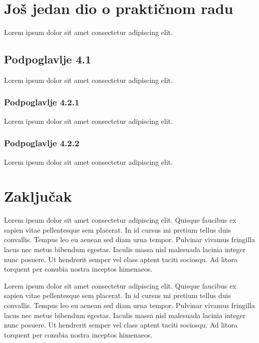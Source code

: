 \chapter{Još jedan dio o praktičnom radu}
Lorem ipsum dolor sit amet consectetur adipiscing elit.

\section{Podpoglavlje 4.1}
Lorem ipsum dolor sit amet consectetur adipiscing elit.

\subsection{Podpoglavlje 4.2.1}
Lorem ipsum dolor sit amet consectetur adipiscing elit.

\subsection{Podpoglavlje 4.2.2}
Lorem ipsum dolor sit amet consectetur adipiscing elit.

\chapter{Zaključak}
Lorem ipsum dolor sit amet consectetur adipiscing elit. Quisque faucibus ex sapien vitae pellentesque sem placerat. In id cursus mi pretium tellus duis convallis. Tempus leo eu aenean sed diam urna tempor. Pulvinar vivamus fringilla lacus nec metus bibendum egestas. Iaculis massa nisl malesuada lacinia integer nunc posuere. Ut hendrerit semper vel class aptent taciti sociosqu. Ad litora torquent per conubia nostra inceptos himenaeos.

Lorem ipsum dolor sit amet consectetur adipiscing elit. Quisque faucibus ex sapien vitae pellentesque sem placerat. In id cursus mi pretium tellus duis convallis. Tempus leo eu aenean sed diam urna tempor. Pulvinar vivamus fringilla lacus nec metus bibendum egestas. Iaculis massa nisl malesuada lacinia integer nunc posuere. Ut hendrerit semper vel class aptent taciti sociosqu. Ad litora torquent per conubia nostra inceptos himenaeos.
